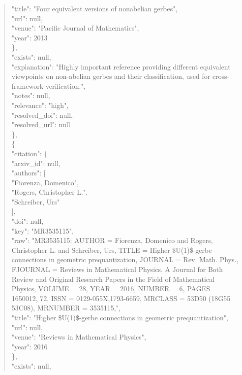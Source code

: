 \documentclass[11pt]{article}
\begin{document}
\begin{quote}
        "title": "Four equivalent versions of nonabelian gerbes",\\
        "url": null,\\
        "venue": "Pacific Journal of Mathematics",\\
        "year": 2013\\
      \},\\
      "exists": null,\\
      "explanation": "Highly important reference providing different equivalent viewpoints on non-abelian gerbes and their classification, used for cross-framework verification.",\\
      "notes": null,\\
      "relevance": "high",\\
      "resolved\_doi": null,\\
      "resolved\_url": null\\
    \},\\
    \{\\
      "citation": \{\\
        "arxiv\_id": null,\\
        "authors": [\\
          "Fiorenza, Domenico",\\
          "Rogers, Christopher L.",\\
          "Schreiber, Urs"\\
        ],\\
        "doi": null,\\
        "key": "MR3535115",\\
        "raw": "MR3535115: AUTHOR = Fiorenza, Domenico and Rogers, Christopher L. and Schreiber, Urs, TITLE = Higher \$U(1)\$-gerbe connections in geometric prequantization, JOURNAL = Rev. Math. Phys., FJOURNAL = Reviews in Mathematical Physics. A Journal for Both Review and Original Research Papers in the Field of Mathematical Physics, VOLUME = 28, YEAR = 2016, NUMBER = 6, PAGES = 1650012, 72, ISSN = 0129-055X,1793-6659, MRCLASS = 53D50 (18G55 53C08), MRNUMBER = 3535115,",\\
        "title": "Higher \$U(1)\$-gerbe connections in geometric prequantization",\\
        "url": null,\\
        "venue": "Reviews in Mathematical Physics",\\
        "year": 2016\\
      \},\\
      "exists": null,\\

\end{quote}
\end{document}
